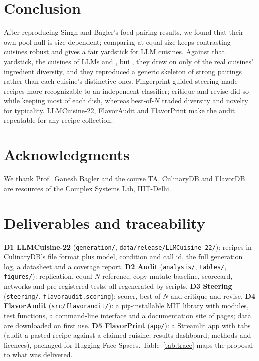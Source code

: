 \documentclass[conference]{IEEEtran}
\begin{document}
\section{Conclusion}
After reproducing Singh and Bagler's food-pairing results, we found that their own-pool null is size-dependent; comparing at equal size keeps \NContrastingRobustText{} contrasting cuisines robust and gives a fair yardstick for LLM cuisines. Against that yardstick, the cuisines of \NModelsDone{} LLMs \NFindingPairing{} and \NFindingSAI, but \NFindingFingerprint, they drew on only \NDivRangePct{} of the real cuisines' ingredient diversity, and they reproduced a generic skeleton of strong pairings rather than each cuisine's distinctive ones. \NFindingCM{} Fingerprint-guided steering made recipes more recognizable to an independent classifier; critique-and-revise did so while keeping most of each dish, whereas best-of-$N$ traded diversity and novelty for typicality. LLMCuisine-22, FlavorAudit and FlavorPrint make the audit repeatable for any recipe collection.

\section*{Acknowledgments}
We thank Prof.\ Ganesh Bagler and the course TA. CulinaryDB and FlavorDB are resources of the Complex Systems Lab, IIIT-Delhi.




\appendices

\section{Deliverables and traceability}\label{app:trace}
\textbf{D1 LLMCuisine-22} (\texttt{generation/}, \texttt{data/release/LLMCuisine-22/}): recipes in CulinaryDB's file format plus model, condition and call id, the full generation log, a datasheet and a coverage report. \textbf{D2 Audit} (\texttt{analysis/}, \texttt{tables/}, \texttt{figures/}): replication, equal-$N$ reference, copy-mutate baseline, scorecard, networks and pre-registered tests, all regenerated by scripts. \textbf{D3 Steering} (\texttt{steering/}, \texttt{flavoraudit.scoring}): scorer, best-of-$N$ and critique-and-revise. \textbf{D4 FlavorAudit} (\texttt{src/flavoraudit/}): a pip-installable MIT library with \NLibModules{} modules, \NLibTests{} test functions, a command-line interface and a documentation site of \NDocsPages{} pages; data are downloaded on first use. \textbf{D5 FlavorPrint} (\texttt{app/}): a Streamlit app with \NAppTabs{} tabs (audit a pasted recipe against a claimed cuisine; results dashboard; methods and licences), packaged for Hugging Face Spaces. Table~\ref{tab:trace} maps the proposal to what was delivered.
\begin{table}[t]
\centering\caption{Traceability from the submitted proposal to the delivered work.}\label{tab:trace}
\footnotesize
\end{table}
\end{document}
